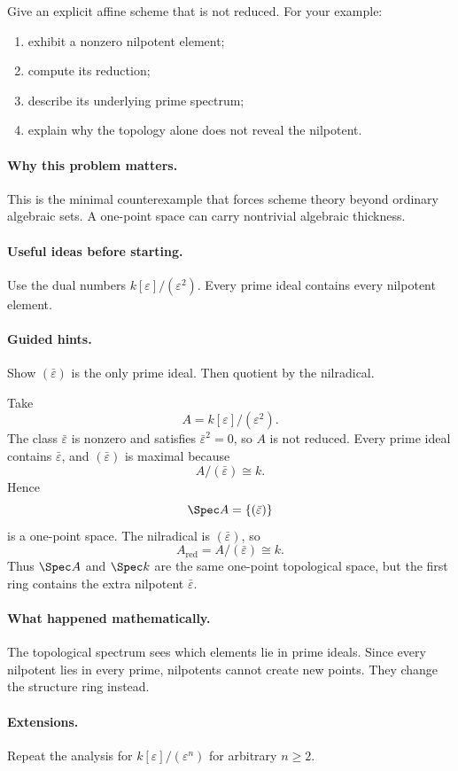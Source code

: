 \begin{problem}
Give an explicit affine scheme that is not reduced.  For your example:
\begin{enumerate}
\item exhibit a nonzero nilpotent element;
\item compute its reduction;
\item describe its underlying prime spectrum;
\item explain why the topology alone does not reveal the nilpotent.
\end{enumerate}
\end{problem}

\paragraph{Why this problem matters.}
This is the minimal counterexample that forces scheme theory beyond ordinary algebraic sets.
A one-point space can carry nontrivial algebraic thickness.

\paragraph{Useful ideas before starting.}
Use the dual numbers $k[\varepsilon]/(\varepsilon^2)$.  Every prime ideal contains every
nilpotent element.

\paragraph{Guided hints.}
Show $(\bar\varepsilon)$ is the only prime ideal.  Then quotient by the nilradical.

\begin{solution}
Take
\[
A=k[\varepsilon]/(\varepsilon^2).
\]
The class $\bar\varepsilon$ is nonzero and satisfies $\bar\varepsilon^2=0$, so $A$ is
not reduced.  Every prime ideal contains $\bar\varepsilon$, and $(\bar\varepsilon)$ is
maximal because
\[
A/(\bar\varepsilon)\cong k.
\]
Hence
\[
\Spec A=\{(\bar\varepsilon)\}
\]
is a one-point space.  The nilradical is $(\bar\varepsilon)$, so
\[
A_{\mathrm{red}}=A/(\bar\varepsilon)\cong k.
\]
Thus $\Spec A$ and $\Spec k$ are the same one-point topological space, but the first ring
contains the extra nilpotent $\bar\varepsilon$.
\end{solution}

\paragraph{What happened mathematically.}
The topological spectrum sees which elements lie in prime ideals.  Since every nilpotent lies
in every prime, nilpotents cannot create new points.  They change the structure ring instead.

\paragraph{Extensions.}
Repeat the analysis for $k[\varepsilon]/(\varepsilon^n)$ for arbitrary $n\ge2$.
